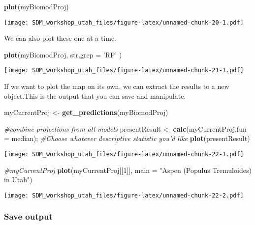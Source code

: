 \documentclass[]{article}
\newenvironment{Shaded}{\begin{snugshade}}{\end{snugshade}}
\newcommand{\KeywordTok}[1]{\textcolor[rgb]{0.13,0.29,0.53}{\textbf{#1}}}
\newcommand{\DataTypeTok}[1]{\textcolor[rgb]{0.13,0.29,0.53}{#1}}
\newcommand{\DecValTok}[1]{\textcolor[rgb]{0.00,0.00,0.81}{#1}}
\newcommand{\StringTok}[1]{\textcolor[rgb]{0.31,0.60,0.02}{#1}}
\newcommand{\CommentTok}[1]{\textcolor[rgb]{0.56,0.35,0.01}{\textit{#1}}}
\newcommand{\NormalTok}[1]{#1}
\begin{document}
\begin{Shaded}
\begin{Highlighting}[]
\KeywordTok{plot}\NormalTok{(myBiomodProj)}
\end{Highlighting}
\end{Shaded}

\texttt{[image: SDM\_workshop\_utah\_files/figure-latex/unnamed-chunk-20-1.pdf]}

We can also plot these one at a time.

\begin{Shaded}
\begin{Highlighting}[]
\KeywordTok{plot}\NormalTok{(myBiomodProj, }\DataTypeTok{str.grep =} \StringTok{'RF'}\NormalTok{ )}
\end{Highlighting}
\end{Shaded}

\texttt{[image: SDM\_workshop\_utah\_files/figure-latex/unnamed-chunk-21-1.pdf]}

If we want to plot the map on its own, we can extract the results to a
new object.This is the output that you can save and manipulate.

\begin{Shaded}
\begin{Highlighting}[]
\NormalTok{myCurrentProj <-}\StringTok{ }\KeywordTok{get_predictions}\NormalTok{(myBiomodProj)}

\CommentTok{#combine projections from all models}
\NormalTok{presentResult <-}\StringTok{ }\KeywordTok{calc}\NormalTok{(myCurrentProj,}\DataTypeTok{fun =}\NormalTok{ median); }\CommentTok{#Choose whatever descriptive statistic you'd like}
\KeywordTok{plot}\NormalTok{(presentResult)}
\end{Highlighting}
\end{Shaded}

\texttt{[image: SDM\_workshop\_utah\_files/figure-latex/unnamed-chunk-22-1.pdf]}

\begin{Shaded}
\begin{Highlighting}[]
\CommentTok{#myCurrentProj}
\KeywordTok{plot}\NormalTok{(myCurrentProj[[}\DecValTok{1}\NormalTok{]], }\DataTypeTok{main =} \StringTok{"Aspen (Populus Tremuloides) in Utah"}\NormalTok{)}
\end{Highlighting}
\end{Shaded}

\texttt{[image: SDM\_workshop\_utah\_files/figure-latex/unnamed-chunk-22-2.pdf]}

\subsubsection{Save output}\label{save-output}
\end{document}
